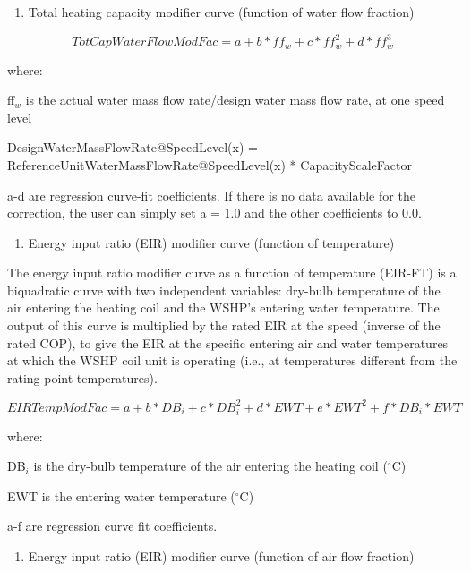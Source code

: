 \begin{enumerate}
\def\labelenumi{\arabic{enumi})}
\setcounter{enumi}{2}
\tightlist
\item
  Total heating capacity modifier curve (function of water flow fraction)
\end{enumerate}

\begin{equation}
TotCapWaterFlowModFac = a + b*f{f_w} + c*ff_w^2 + d*ff_w^3
\end{equation}

where:

ff\(_{w}\) is the actual water mass flow rate/design water mass flow rate, at one speed level

DesignWaterMassFlowRate@SpeedLevel(x) = ReferenceUnitWaterMassFlowRate@SpeedLevel(x) * CapacityScaleFactor

a-d are regression curve-fit coefficients.  If there is no data available for the correction, the user can simply set a = 1.0 and the other coefficients to 0.0.

\begin{enumerate}
\def\labelenumi{\arabic{enumi})}
\setcounter{enumi}{3}
\tightlist
\item
  Energy input ratio (EIR) modifier curve (function of temperature)
\end{enumerate}

The energy input ratio modifier curve as a function of temperature (EIR-FT) is a biquadratic curve with two independent variables: dry-bulb temperature of the air entering the heating coil and the WSHP's entering water temperature. The output of this curve is multiplied by the rated EIR at the speed (inverse of the rated COP), to give the EIR at the specific entering air and water temperatures at which the WSHP coil unit is operating (i.e., at temperatures different from the rating point temperatures).

\begin{equation}
EIRTempModFac = a + b*D{B_i} + c*DB_i^2 + d*EWT + e*EW{T^2} + f*D{B_i}*EWT
\end{equation}

where:

DB\(_{i}\) is the dry-bulb temperature of the air entering the heating coil (\(^{\circ}\)C)

EWT is the entering water temperature (\(^{\circ}\)C)

a-f are regression curve fit coefficients.

\begin{enumerate}
\def\labelenumi{\arabic{enumi})}
\setcounter{enumi}{4}
\tightlist
\item
  Energy input ratio (EIR) modifier curve (function of air flow fraction)
\end{enumerate}

